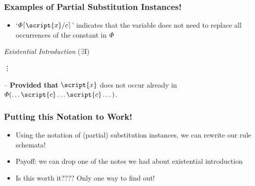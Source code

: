 \begin{frame}
\frametitle{Examples of Partial Substitution Instances!}

\begin{itemize}[<+->]

\item `$\metaA{}\substitutesome{c}{\script{x}}$' indicates that  the variable  does not need to replace all occurrences of the constant  in $\varPhi{}$

\end{itemize}

\begin{multicols}{2}

\begin{fitchproof}
	 
	 
	 
	 
\end{fitchproof}
\columnbreak

\begin{center}
\textit{Existential Introduction} ($\exists$I) \vspace{-0.5em}
\begin{fitchproof}
	 {\hspace{2em} \vdots}
 
\end{fitchproof}
    \end{center}
 -- \textbf{Provided that} $\script{x}$ does not occur already in $\metaA{}(\dots \script{c} \dots \script{c} \dots)$. %
 \vspace{5em}

\end{multicols}
\end{frame}

\begin{frame}
\frametitle{Putting this Notation to Work!}

\begin{itemize}[<+->]

\item Using the notation of (partial) substitution instances, we can rewrite our rule schemata!

\item Payoff: we can drop one of the notes we had about existential introduction

\item Is this worth it???? Only one way to find out!

\end{itemize}
\end{frame}


